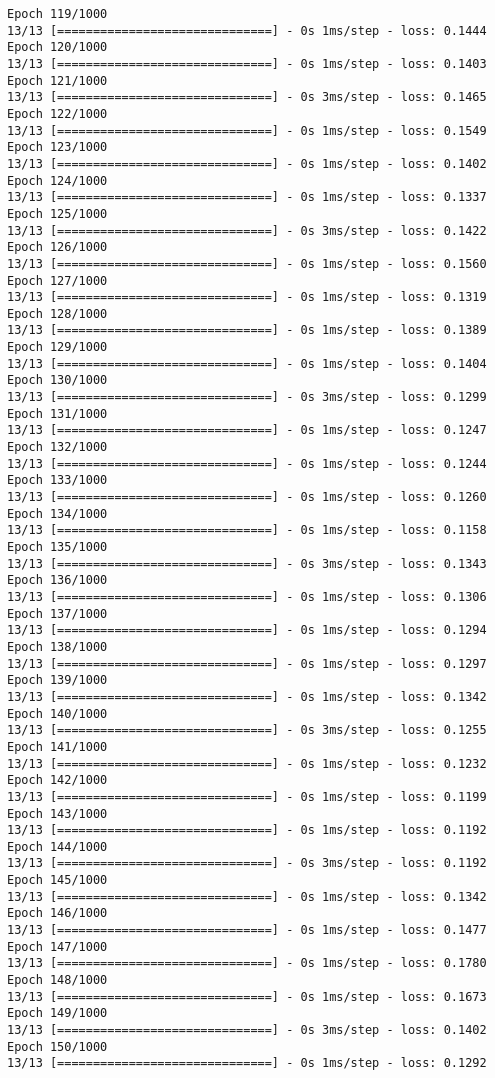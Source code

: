 \documentclass[11pt]{article}
\begin{document}
\begin{Verbatim}[commandchars=\\\{\}]
Epoch 119/1000
13/13 [==============================] - 0s 1ms/step - loss: 0.1444
Epoch 120/1000
13/13 [==============================] - 0s 1ms/step - loss: 0.1403
Epoch 121/1000
13/13 [==============================] - 0s 3ms/step - loss: 0.1465
Epoch 122/1000
13/13 [==============================] - 0s 1ms/step - loss: 0.1549
Epoch 123/1000
13/13 [==============================] - 0s 1ms/step - loss: 0.1402
Epoch 124/1000
13/13 [==============================] - 0s 1ms/step - loss: 0.1337
Epoch 125/1000
13/13 [==============================] - 0s 3ms/step - loss: 0.1422
Epoch 126/1000
13/13 [==============================] - 0s 1ms/step - loss: 0.1560
Epoch 127/1000
13/13 [==============================] - 0s 1ms/step - loss: 0.1319
Epoch 128/1000
13/13 [==============================] - 0s 1ms/step - loss: 0.1389
Epoch 129/1000
13/13 [==============================] - 0s 1ms/step - loss: 0.1404
Epoch 130/1000
13/13 [==============================] - 0s 3ms/step - loss: 0.1299
Epoch 131/1000
13/13 [==============================] - 0s 1ms/step - loss: 0.1247
Epoch 132/1000
13/13 [==============================] - 0s 1ms/step - loss: 0.1244
Epoch 133/1000
13/13 [==============================] - 0s 1ms/step - loss: 0.1260
Epoch 134/1000
13/13 [==============================] - 0s 1ms/step - loss: 0.1158
Epoch 135/1000
13/13 [==============================] - 0s 3ms/step - loss: 0.1343
Epoch 136/1000
13/13 [==============================] - 0s 1ms/step - loss: 0.1306
Epoch 137/1000
13/13 [==============================] - 0s 1ms/step - loss: 0.1294
Epoch 138/1000
13/13 [==============================] - 0s 1ms/step - loss: 0.1297
Epoch 139/1000
13/13 [==============================] - 0s 1ms/step - loss: 0.1342
Epoch 140/1000
13/13 [==============================] - 0s 3ms/step - loss: 0.1255
Epoch 141/1000
13/13 [==============================] - 0s 1ms/step - loss: 0.1232
Epoch 142/1000
13/13 [==============================] - 0s 1ms/step - loss: 0.1199
Epoch 143/1000
13/13 [==============================] - 0s 1ms/step - loss: 0.1192
Epoch 144/1000
13/13 [==============================] - 0s 3ms/step - loss: 0.1192
Epoch 145/1000
13/13 [==============================] - 0s 1ms/step - loss: 0.1342
Epoch 146/1000
13/13 [==============================] - 0s 1ms/step - loss: 0.1477
Epoch 147/1000
13/13 [==============================] - 0s 1ms/step - loss: 0.1780
Epoch 148/1000
13/13 [==============================] - 0s 1ms/step - loss: 0.1673
Epoch 149/1000
13/13 [==============================] - 0s 3ms/step - loss: 0.1402
Epoch 150/1000
13/13 [==============================] - 0s 1ms/step - loss: 0.1292

\end{Verbatim}
\end{document}
